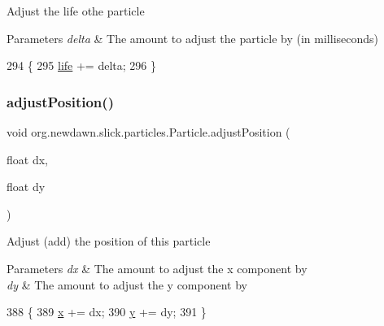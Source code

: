 Adjust the life othe particle


\begin{DoxyParams}{Parameters}
{\em delta} & The amount to adjust the particle by (in milliseconds) \\
\hline
\end{DoxyParams}

\begin{DoxyCode}
294                                         \{
295         \mbox{\hyperlink{classorg_1_1newdawn_1_1slick_1_1particles_1_1_particle_a361d2a9d01b66d38d90496c096970aab}{life}} += delta;
296     \}
\end{DoxyCode}
\mbox{\label{classorg_1_1newdawn_1_1slick_1_1particles_1_1_particle_a2fc8c3eaf8740bc5a24ef4d091a2a254}} 
\subsubsection{\texorpdfstring{adjust\+Position()}{adjustPosition()}}
{\footnotesize\ttfamily void org.\+newdawn.\+slick.\+particles.\+Particle.\+adjust\+Position (\begin{DoxyParamCaption}\item[{float}]{dx,  }\item[{float}]{dy }\end{DoxyParamCaption})\hspace{0.3cm}{\ttfamily [inline]}}

Adjust (add) the position of this particle


\begin{DoxyParams}{Parameters}
{\em dx} & The amount to adjust the x component by \\
\hline
{\em dy} & The amount to adjust the y component by \\
\hline
\end{DoxyParams}

\begin{DoxyCode}
388                                                    \{
389         \mbox{\hyperlink{classorg_1_1newdawn_1_1slick_1_1particles_1_1_particle_ae1ee7d5a72b34bbdb44110dfa2795674}{x}} += dx;
390         \mbox{\hyperlink{classorg_1_1newdawn_1_1slick_1_1particles_1_1_particle_ad784e37c1fdad77abc886521b8e907b2}{y}} += dy;
391     \}
\end{DoxyCode}
\mbox{\label{classorg_1_1newdawn_1_1slick_1_1particles_1_1_particle_a205522698a9f928b6a136ad06e80f506}} 
